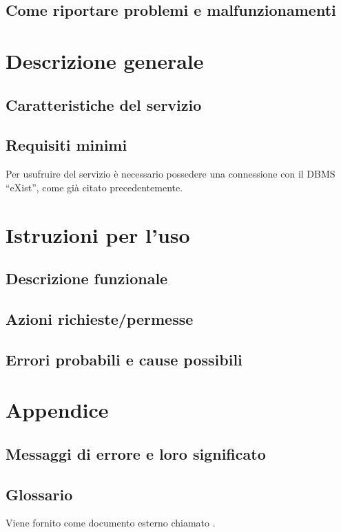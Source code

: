 \documentclass[11pt,titlepage,a4paper]{report}
\begin{document}
\section{Come riportare problemi e malfunzionamenti}
\chapter{Descrizione generale}
\section{Caratteristiche del servizio}
\section{Requisiti minimi}
Per usufruire del servizio \`e necessario possedere una connessione con il DBMS ``eXist'', come gi\`a citato precedentemente.
\chapter{Istruzioni per l'uso}
\section{Descrizione funzionale}

\section{Azioni richieste/permesse}

\section{Errori probabili e cause possibili}
\chapter{Appendice}
\section{Messaggi di errore e loro significato}
\section{Glossario}
Viene fornito come documento esterno chiamato \Glossario.

\newpage
\end{document}
